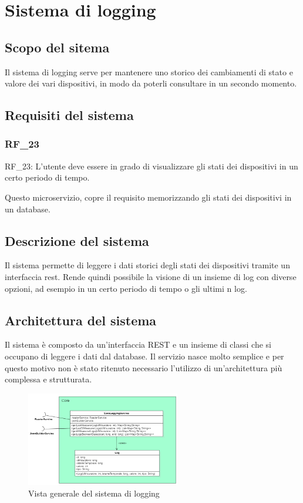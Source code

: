 \chapter{Sistema di logging}\label{cap:microservizio-logging}

\section{Scopo del sitema}

Il sistema di logging serve per mantenere uno storico dei cambiamenti di stato e valore dei vari dispositivi, in modo da poterli consultare in un secondo momento. 

\section{Requisiti del sistema}

\subsection{RF\_23}

RF\_23: L'utente deve essere in grado di visualizzare gli stati dei dispositivi in un certo periodo di tempo.

Questo microservizio, copre il requisito memorizzando gli stati dei dispositivi in un database.

\section{Descrizione del sistema}
Il sistema permette di leggere i dati storici degli stati dei dispositivi tramite un interfaccia rest. Rende quindi possibile la visione di un insieme di log con diverse opzioni, ad esempio in un certo periodo di tempo o gli ultimi n log.

\section{Architettura del sistema}

Il sistema è composto da un'interfaccia REST e un insieme di classi che si occupano di leggere i dati dal database.
Il servizio nasce molto semplice e per questo motivo non è stato ritenuto necessario l'utilizzo di un'architettura più complessa e strutturata.

\begin{figure}[ht]
    \centering
    \includegraphics[width=0.6\textwidth]{img/classi_logging.png}
    \caption{Vista generale del sistema di logging}
    \label{fig:general_logging}
\end{figure}

